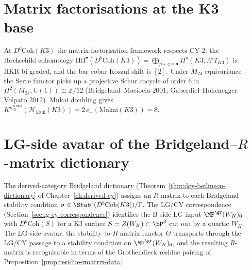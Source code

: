 \section{Matrix factorisations at the K3 base}
\label{sec:mf-k3-base}

\begin{remark}
\label{rem:mf-cy2-shift}
At $D^b\mathrm{Coh}(K3)$ the matrix-factorisation framework respects CY-$2$: the
Hochschild cohomology $\mathrm{HH}^\bullet(D^b\mathrm{Coh}(K3)) = \bigoplus_{p+q=\bullet} H^p(K3, \Lambda^q T_{K3})$ is HKR bi-graded, and the bar-cobar Koszul shift is $[2]$. Under $\widetilde{M}_{24}$-equivariance the Serre functor picks up a projective Schur cocycle of order $6$ in $H^2(M_{24}, \mathrm{U}(1)) \cong \mathbb{Z}/12$ (Bridgeland--Maciocia $2001$; Gaberdiel--Hohenegger--Volpato $2012$). Mukai doubling gives $K^{\kappa_{\mathrm{ch}}^{\mathrm{Mukai}}}(\mathcal{H}_{\mathrm{Muk}}(K3)) = 2\,c_+(\mathrm{Mukai}(K3)) = 8$.
\end{remark}

\section{LG-side avatar of the Bridgeland--\texorpdfstring{$R$}{R}-matrix dictionary}
\label{sec:mf-lg-avatar-bridgeland-rmatrix}

The derived-category Bridgeland dictionary
(Theorem~\ref{thm:dcy-beilinson-dictionary} of
Chapter~\ref{ch:derived-cy}) assigns an $R$-matrix to each Bridgeland
stability condition $\sigma\in\Stab^\dagger(D^b\mathrm{Coh}(K3))/\Gamma$.
The LG/CY correspondence (Section~\ref{sec:lg-cy-correspondence})
identifies the B-side LG input $\MF^{\gr}(W_K)_0$ with
$D^b\mathrm{Coh}(S)$ for a K3 surface $S=Z(W_K)\subset\bP^3$ cut out by a
quartic $W_K$. The LG-side avatar: the stability-to-$R$-matrix functor
$\Theta$ transports through the LG/CY passage to a stability condition
on $\MF^{\gr}(W_K)_0$, and the resulting $R$-matrix is recognisable in
terms of the Grothendieck residue pairing of
Proposition~\ref{prop:residue-rmatrix-data}.

